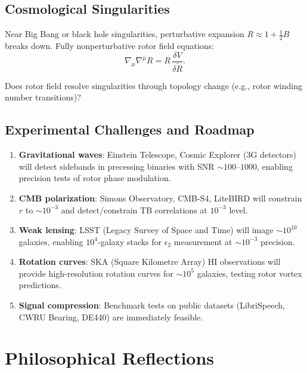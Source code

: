 \documentclass[11pt,a4paper]{article}
\numberwithin{equation}{section}
\theoremstyle{plain}
\theoremstyle{definition}
\theoremstyle{remark}
\newcommand{\rev}[1]{\widetilde{#1}}       %
\begin{document}
\subsection{Cosmological Singularities}

Near Big Bang or black hole singularities, perturbative expansion $R \approx 1 + \frac{1}{2}B$ breaks down. Fully nonperturbative rotor field equations:
\begin{equation}
\nabla_\mu\nabla^\mu R = R\,\frac{\delta V}{\delta\rev{R}}.
\end{equation}

Does rotor field resolve singularities through topology change (e.g., rotor winding number transitions)?

\subsection{Experimental Challenges and Roadmap}

\begin{enumerate}
\item \textbf{Gravitational waves}: Einstein Telescope, Cosmic Explorer (3G detectors) will detect sidebands in precessing binaries with SNR $\sim 100$–$1000$, enabling precision tests of rotor phase modulation.

\item \textbf{CMB polarization}: Simons Observatory, CMB-S4, LiteBIRD will constrain $r$ to $\sim 10^{-3}$ and detect/constrain TB correlations at $10^{-3}$ level.

\item \textbf{Weak lensing}: LSST (Legacy Survey of Space and Time) will image $\sim 10^{10}$ galaxies, enabling $10^4$-galaxy stacks for $\epsilon_2$ measurement at $\sim 10^{-3}$ precision.

\item \textbf{Rotation curves}: SKA (Square Kilometre Array) HI observations will provide high-resolution rotation curves for $\sim 10^5$ galaxies, testing rotor vortex predictions.

\item \textbf{Signal compression}: Benchmark tests on public datasets (LibriSpeech, CWRU Bearing, DE440) are immediately feasible.
\end{enumerate}

\section{Philosophical Reflections}
\label{sec:philosophy}
\end{document}
